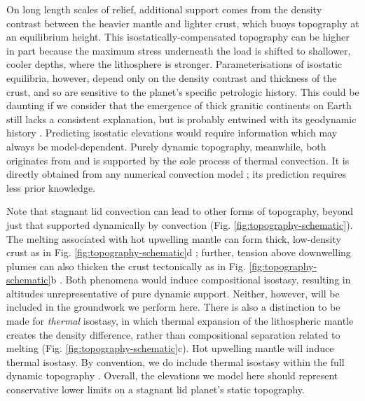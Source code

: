 On long length scales of relief, additional support comes from the density contrast between the heavier mantle and lighter crust, which buoys topography at an equilibrium height. This isostatically-compensated topography can be higher in part because the maximum stress underneath the load is shifted to shallower, cooler depths, where the lithosphere is stronger. Parameterisations of isostatic equilibria, however, depend only on the density contrast and thickness of the crust, and so are sensitive to the planet's specific petrologic history. This could be daunting if we consider that the emergence of thick granitic continents on Earth still lacks a consistent explanation, but is probably entwined with its geodynamic history \citep{lenardic_continental_2005,
korenaga_crustal_2018, honing_bifurcation_2019}. Predicting isostatic elevations would require information which may always be model-dependent. Purely dynamic topography, meanwhile, both originates from and is supported by the sole process of thermal convection. It is directly obtained from any numerical convection model \citep[e.g.,][]{mckenzie_surface_1977, kiefer_geoid_1992, kiefer_geoid_1998, huang_constraints_2013, arnould_scales_2018, lees_gravity_2020}; its prediction requires less prior knowledge.

Note that stagnant lid convection can lead to other forms of topography, beyond just that supported dynamically by convection (Fig. \ref{fig:topography-schematic}). The melting associated with hot upwelling mantle can form thick, low-density crust as in Fig. \ref{fig:topography-schematic}d \citep{stofan_large_1995}; further, tension above downwelling plumes can also thicken the crust tectonically as in Fig. \ref{fig:topography-schematic}b \citep{kiefer_mantle_1991,pysklywec_timedependent_2003, zampa_evidence_2018}. Both phenomena would induce compositional isostasy, resulting in altitudes unrepresentative of pure dynamic support. Neither, however, will be included in the groundwork we perform here. There is also a distinction to be made for \textit{thermal} isostasy, in which thermal expansion of the lithospheric mantle creates the density difference, rather than compositional separation related to melting (Fig. \ref{fig:topography-schematic}c). Hot upwelling mantle will induce thermal isostasy. By convention, we do include thermal isostasy within the full dynamic topography \citep[see][]{molnar_mantle_2015, hoggard_observational_2021}. Overall, the elevations we model here should represent conservative lower limits on a stagnant lid planet's static topography.

